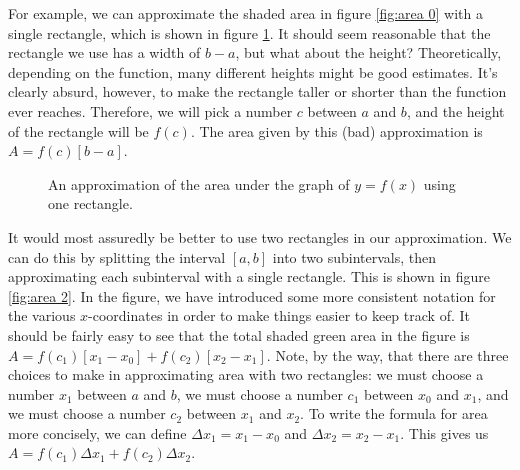 \documentclass{myarticle}
\theoremstyle{nospace}
\newtheorem{old series theorem}{Theorem}
\newenvironment{series theorem}{\begin{mdframed}\begin{old series theorem}}{\end{old series theorem}\end{mdframed}}
\begin{document}
For example, we can approximate the shaded area in figure \ref{fig:area 0} with a single rectangle, which is shown in figure \ref{fig:area 1}. It should seem reasonable that the rectangle we use has a width of $b - a$, but what about the height? Theoretically, depending on the function, many different heights might be good estimates. It's clearly absurd, however, to make the rectangle taller or shorter than the function ever reaches. Therefore, we will pick a number $c$ between $a$ and $b$, and the height of the rectangle will be $f(c)$. The area given by this (bad) approximation is $A = f(c)[b - a]$.

\begin{figure}[htb!] \centering
{}
\caption{An approximation of the area under the graph of $y = f(x)$ using one rectangle.}
\label{fig:area 1}
\end{figure}

It would most assuredly be better to use two rectangles in our approximation. We can do this by splitting the interval $[a, b]$ into two subintervals, then approximating each subinterval with a single rectangle. This is shown in figure \ref{fig:area 2}. In the figure, we have introduced some more consistent notation for the various $x$-coordinates in order to make things easier to keep track of. It should be fairly easy to see that the total shaded green area in the figure is $A = f(c_1)[x_1 - x_0] + f(c_2)[x_2 - x_1]$. Note, by the way, that there are three choices to make in approximating area with two rectangles: we must choose a number $x_1$ between $a$ and $b$, we must choose a number $c_1$ between $x_0$ and $x_1$, and we must choose a number $c_2$ between $x_1$ and $x_2$. To write the formula for area more concisely, we can define $\Delta x_1 = x_1 - x_0$ and $\Delta x_2 = x_2 - x_1$. This gives us $A = f(c_1)\Delta x_1 + f(c_2)\Delta x_2$.
\end{document}
